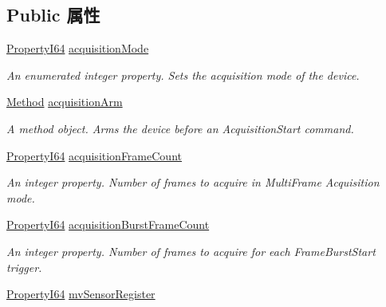 \subsection*{Public 属性}
\begin{DoxyCompactItemize}
\item 
\hyperlink{group___common_interface_ga81749b2696755513663492664a18a893}{Property\+I64} \hyperlink{classmv_i_m_p_a_c_t_1_1acquire_1_1_gen_i_cam_1_1_acquisition_control_aa07380cf251a40c38a2c7f9abbf3c0f1}{acquisition\+Mode}
\begin{DoxyCompactList}\small\item\em An enumerated integer property. Sets the acquisition mode of the device. \end{DoxyCompactList}\item 
\hyperlink{classmv_i_m_p_a_c_t_1_1acquire_1_1_method}{Method} \hyperlink{classmv_i_m_p_a_c_t_1_1acquire_1_1_gen_i_cam_1_1_acquisition_control_a05def6315f448a15576cb0746f791b26}{acquisition\+Arm}
\begin{DoxyCompactList}\small\item\em A method object. Arms the device before an Acquisition\+Start command. \end{DoxyCompactList}\item 
\hyperlink{group___common_interface_ga81749b2696755513663492664a18a893}{Property\+I64} \hyperlink{classmv_i_m_p_a_c_t_1_1acquire_1_1_gen_i_cam_1_1_acquisition_control_a30953769d4d702d7a24cabd86d608bee}{acquisition\+Frame\+Count}
\begin{DoxyCompactList}\small\item\em An integer property. Number of frames to acquire in Multi\+Frame Acquisition mode. \end{DoxyCompactList}\item 
\hyperlink{group___common_interface_ga81749b2696755513663492664a18a893}{Property\+I64} \hyperlink{classmv_i_m_p_a_c_t_1_1acquire_1_1_gen_i_cam_1_1_acquisition_control_ae206f145121c4fd3adfb0f47a9a917ea}{acquisition\+Burst\+Frame\+Count}
\begin{DoxyCompactList}\small\item\em An integer property. Number of frames to acquire for each Frame\+Burst\+Start trigger. \end{DoxyCompactList}\item 
\hyperlink{group___common_interface_ga81749b2696755513663492664a18a893}{Property\+I64} \hyperlink{classmv_i_m_p_a_c_t_1_1acquire_1_1_gen_i_cam_1_1_acquisition_control_a985987bd6fa29ef835556c49a20e133d}{mv\+Sensor\+Register}

\end{DoxyCompactItemize}
